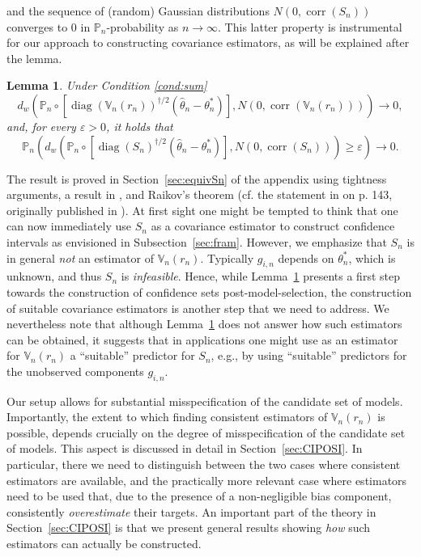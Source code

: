 \documentclass[preprint]{imsart}
\newcommand{\V}{{\mathbb V}}
\renewcommand{\P}{{\mathbb P}}
\newcommand{\eps}{\varepsilon}
\DeclareMathOperator{\diag}{diag}
\DeclareMathOperator{\corr}{corr}
\newtheorem{lemma}[theorem]{Lemma}
\numberwithin{equation}{section}
\begin{document}
% 
and the sequence of (random) Gaussian distributions $N\left(0, \corr(S_n)\right)$ converges to $0$ in $\P_n$-probability as $n \to \infty$. This latter property is instrumental for our approach to constructing covariance estimators, as will be explained after the lemma.
%
\begin{lemma}\label{lemma:equivSn}
Under Condition \ref{cond:sum}
%
\begin{equation*}
d_w\left(\mathbb{P}_n \circ  \left[\diag(\mathbb{V}_n(r_n))^{\dagger/2} \left(\hat{\theta}_n - \theta_n^* \right)\right] , N\left(0, \corr(\mathbb{V}_n(r_n))\right)\right) \to 0,
\end{equation*}
%
and, for every $\eps > 0$, it holds that
%
\begin{equation*}
\mathbb{P}_n \left(d_w\left(\mathbb{P}_n \circ  \left[\diag(S_n)^{\dagger/2} \left(\hat{\theta}_n - \theta_n^* \right)\right] , N(0, \corr(S_n))\right) \geq \eps \right) \to 0.
\end{equation*}
%
\end{lemma}
%
The result is proved in Section~\ref{sec:equivSn} of the appendix using tightness arguments, a result in \cite{pollak1972}, and Raikov's theorem (cf. the statement in \cite{gnedenko} on p. 143, originally published in \cite{raikov}). At first sight one might be tempted to think that one can now immediately use $S_n$ as a covariance estimator to construct confidence intervals as envisioned in Subsection~\ref{sec:fram}. However, we emphasize that $S_n$ is in general \textit{not} an estimator of $\mathbb{V}_n(r_n)$. Typically $g_{i,n}$ depends on $\theta_n^*$, which is unknown, and thus $S_n$ is \textit{infeasible}. Hence, while Lemma~\ref{lemma:equivSn} presents a first step towards the construction of confidence sets post-model-selection, the construction of suitable covariance estimators is another step that we need to address. We nevertheless note that although Lemma~\ref{lemma:equivSn} does not answer how such estimators can be obtained, it suggests that in applications one might use as an estimator for $\mathbb{V}_n(r_n)$ a ``suitable'' predictor for $S_n$, e.g., by using ``suitable'' predictors for the unobserved components $g_{i,n}$. 

Our setup allows for substantial misspecification of the candidate set of models. Importantly, the extent to which finding consistent estimators of $\V_n(r_n)$ is possible, depends crucially on the degree of misspecification of the candidate set of models. This aspect is discussed in detail in Section~\ref{sec:CIPOSI}. In particular, there we need to distinguish between the two cases where consistent estimators are available, and the practically more relevant case where estimators need to be used that, due to the presence of a non-negligible bias component, consistently \textit{overestimate} their targets. An important part of the theory in Section~\ref{sec:CIPOSI} is that we present general results showing \textit{how} such estimators can actually be constructed. 
\end{document}
